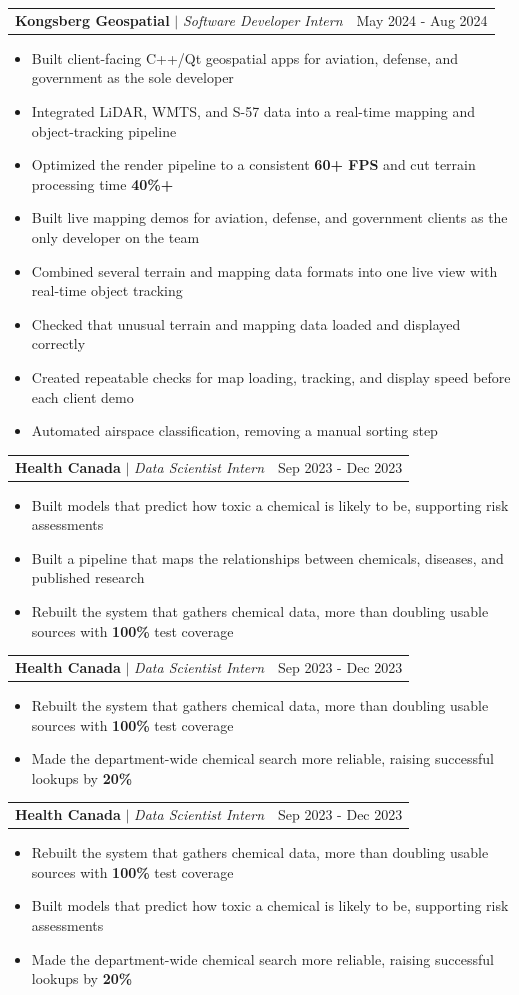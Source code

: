 \documentclass[letterpaper,10pt]{article}
\makeatletter
\newcommand{\resumeItem}[1]{
  \item\normalsize{
    {#1 \vspace{0pt}}
  }
}
\newcommand{\resumeSubheading}[3]{
    \item
    \begin{tabular*}{0.97\textwidth}[t]{l@{\extracolsep{\fill}}r}
      \textbf{#1} $|$ \textit{ #2} & #3 \\
    \end{tabular*}\vspace{-2pt}
}
\newcommand{\resumeItemListStart}{\begin{itemize}[topsep=2pt, itemsep=1pt, parsep=0pt, partopsep=0pt]}
\newcommand{\resumeItemListEnd}{\end{itemize}\vspace{0pt}}
\makeatother
\begin{document}
    \ifdefined\flagAIML\else
    \resumeSubheading{Kongsberg Geospatial}{Software Developer Intern}{May 2024 - Aug 2024}
      \resumeItemListStart
        \ifdefined\flagSWE
        \resumeItem{Built client-facing C++/Qt geospatial apps for aviation, defense, and government as the sole developer}
        \resumeItem{Integrated LiDAR, WMTS, and S-57 data into a real-time mapping and object-tracking pipeline}
        \resumeItem{Optimized the render pipeline to a consistent \textbf{60+ FPS} and cut terrain processing time \textbf{40\%+}}
        \else
        \resumeItem{Built live mapping demos for aviation, defense, and government clients as the only developer on the team}
        \resumeItem{Combined several terrain and mapping data formats into one live view with real-time object tracking}
        \fi
        \ifdefined\flagSWE
        \else\ifdefined\flagQA
        \resumeItem{Checked that unusual terrain and mapping data loaded and displayed correctly}
        \resumeItem{Created repeatable checks for map loading, tracking, and display speed before each client demo}
        \else
        \resumeItem{Automated airspace classification, removing a manual sorting step}
        \fi
        \fi
      \resumeItemListEnd
    \fi

    \ifdefined\flagAIML
    \resumeSubheading{Health Canada}{Data Scientist Intern}{Sep 2023 - Dec 2023}
      \resumeItemListStart
        \resumeItem{Built models that predict how toxic a chemical is likely to be, supporting risk assessments}
        \resumeItem{Built a pipeline that maps the relationships between chemicals, diseases, and published research}
        \resumeItem{Rebuilt the system that gathers chemical data, more than doubling usable sources with \textbf{100\%} test coverage}
      \resumeItemListEnd
    \else\ifdefined\flagQA
    \resumeSubheading{Health Canada}{Data Scientist Intern}{Sep 2023 - Dec 2023}
      \resumeItemListStart
        \resumeItem{Rebuilt the system that gathers chemical data, more than doubling usable sources with \textbf{100\%} test coverage}
        \resumeItem{Made the department-wide chemical search more reliable, raising successful lookups by \textbf{20\%}}
      \resumeItemListEnd
    \else\ifdefined\flagSWE\else
    \resumeSubheading{Health Canada}{Data Scientist Intern}{Sep 2023 - Dec 2023}
      \resumeItemListStart
        \resumeItem{Rebuilt the system that gathers chemical data, more than doubling usable sources with \textbf{100\%} test coverage}
        \resumeItem{Built models that predict how toxic a chemical is likely to be, supporting risk assessments}
        \resumeItem{Made the department-wide chemical search more reliable, raising successful lookups by \textbf{20\%}}
      \resumeItemListEnd
    \fi
    \fi\fi
\end{document}
